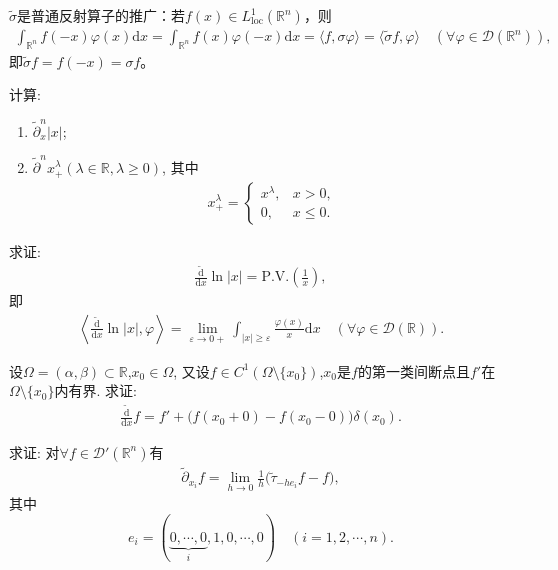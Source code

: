 \documentclass[../../main.tex]{subfiles}%
\begin{document}
\begin{remark}
$\widetilde{\sigma}$是普通反射算子的推广：若$f(x)\in L^1_{\mathrm{loc}}(\mathbb{R}^n)$，则
\begin{align*}
\int_{\mathbb{R}^n}f(-x)\varphi(x)\mathrm{d}x=\int_{\mathbb{R}^n}f(x)\varphi(-x)\mathrm{d}x=\langle f,\sigma\varphi\rangle=\langle\widetilde{\sigma}f,\varphi\rangle\quad(\forall\varphi\in\mathscr{D}(\mathbb{R}^n)),
\end{align*}
即$\widetilde{\sigma}f=f(-x)=\sigma f$。
\end{remark}

\begin{example}
计算:
\begin{enumerate}[(1)]
\item $\widetilde{\partial}_x^n |x|$;
\item $\widetilde{\partial}^n x_+^\lambda(\lambda\in\mathbb R,\lambda\geqslant0)$, 其中
\begin{align*}
x_+^\lambda=
\begin{cases}
x^\lambda, & x>0,\\
0, & x\leqslant0.
\end{cases}
\end{align*}
\end{enumerate}
\end{example}

\begin{example}
求证:
\begin{align*}
\frac{\widetilde{\mathrm d}}{\mathrm d x}\ln|x|=\mathrm{P.V.}\left(\frac{1}{x}\right),
\end{align*}
即
\begin{align*}
\left\langle \frac{\widetilde{\mathrm d}}{\mathrm d x}\ln|x|,\varphi \right\rangle=\lim\limits_{\varepsilon\to0+}\int_{|x|\geqslant\varepsilon}\frac{\varphi(x)}{x}\mathrm{d}x\quad(\forall\varphi\in\mathscr{D}(\mathbb R)).
\end{align*}
\end{example}

\begin{example}
设$\Omega=(\alpha,\beta)\subset\mathbb R$,$x_0\in\Omega$, 又设$f\in C^1(\Omega\setminus\{x_0\})$,$x_0$是$f$的第一类间断点且$f'$在$\Omega\setminus\{x_0\}$内有界. 求证:
\begin{align*}
\frac{\widetilde{\mathrm d}}{\mathrm d x}f=f'+\big(f(x_0+0)-f(x_0-0)\big)\delta(x_0).
\end{align*}
\end{example}

\begin{example}
求证: 对$\forall f\in\mathscr{D}'(\mathbb R^n)$有
\begin{align*}
\widetilde{\partial}_{x_i}f=\lim\limits_{h\to0}\frac{1}{h}\big(\widetilde{\tau}_{-he_i}f-f\big),
\end{align*}
其中
$$e_i=(\underbrace{0,\cdots,0}_{i},1,0,\cdots,0)\quad(i=1,2,\cdots,n).$$
\end{example}
\end{document}
